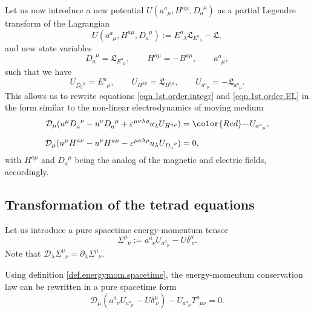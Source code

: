 \documentclass[
10pt, %
a4paper, %
oneside, %
headinclude,footinclude, %
BCOR5mm, %
]{scrartcl}
\newcommand{\pd}{\partial}
\newcommand{\tetr}[2]{a^{#1}_{\phantom{#1}#2}}
\newcommand{\D}[1]{\mathcal{D}_{#1}} %
\newcommand{\Tors}[2]{T^{#1}_{\phantom{a}#2}}
\newcommand{\ET}[2]{E^{#1}_{\phantom{#1}#2}}	%
\newcommand{\eT}[2]{D_{#1}^{\phantom{#1}#2}}	%
\newcommand{\BT}[2]{B^{#1#2}}	%
\newcommand{\hT}[2]{H^{#1#2}}	%
\newcommand{\LagBE}{\mathfrak{L}}%
\newcommand{\veps}{\varepsilon}
\newcommand{\EM}[2]{\Sigma^{#1}_{\phantom{#1}#2}}
\begin{document}
Let us now introduce a new potential $ U(\tetr{a}{\mu},\hT{a}{\mu},\eT{a}{\mu}) $ as a partial 
Legendre transform of the Lagrangian
\begin{equation}
 U(\tetr{a}{\mu},\hT{a}{\mu},\eT{a}{\mu}) := \ET{a}{\lambda}\LagBE_{\ET{a}{\lambda}} - \LagBE,
\end{equation}
and new state variables
\begin{equation}
\eT{a}{\mu} = \LagBE_{\ET{a}{\mu}}, \qquad \hT{a}{\mu} = -\BT{a}{\mu}, \qquad \tetr{a}{\mu},
\end{equation}
such that we have
\begin{equation}
U_{\eT{a}{\mu}} = \ET{a}{\mu}, \qquad U_{\hT{a}{\mu}} = \LagBE_{\BT{a}{\mu}},
\qquad U_{\tetr{a}{\mu}} = - \LagBE_{\tetr{a}{\mu}}.
\end{equation}
This allows us to rewrite equations \eqref{eqn.1st.order.integr} and \eqref{eqn.1st.order.EL} in 
the form similar to the non-linear 
electrodynamics of moving medium~\cite{Obukhov2008,DPRZ2017,Hohmann2018a}
\begin{subequations}
	\begin{align}
		\D{\mu}(u^\mu\eT{a}{\nu} - u^\nu\eT{a}{\mu} + \veps^{\mu\nu\lambda\rho}u_\lambda 
		U_{\hT{a}{\rho}})
		& ={\color{Red}\bm{-}}U_{\tetr{a}{\mu}},\\[2mm]
		\D{\mu}(u^\mu \hT{a}{\nu} - u^\nu\hT{a}{\mu} - 
		\veps^{\mu\nu\lambda\rho}u_\lambda 
		U_{\eT{a}{\rho}}) 
		& = 0,
\end{align}
\end{subequations}
with $\hT{a}{\mu}$ and $\eT{a}{\mu}$ being the analog of the magnetic and electric fields, 
accordingly.


\subsection{Transformation of the tetrad equations}

Let us introduce a pure spacetime energy-momentum tensor
\begin{equation}\label{def.energymom.spacetime}
\EM{\mu}{\nu} := \tetr{a}{\nu} U_{\tetr{a}{\mu}} - U \delta^\mu_{\ \nu}.
\end{equation}
Note that $ \D{\lambda} \EM{\mu}{\nu} = \pd_\lambda\EM{\mu}{\nu} $. 

Using definition \eqref{def.energymom.spacetime}, the energy-momentum conservation law can be 
rewritten in a pure spacetime form
\begin{equation}
\D{\mu} (\tetr{a}{\nu} U_{\tetr{a}{\mu}} - U \delta^\mu_{\ \nu}) - U_{\tetr{a}{\mu}} 
\Tors{a}{\mu\nu} = 0.
\end{equation}
\end{document}
